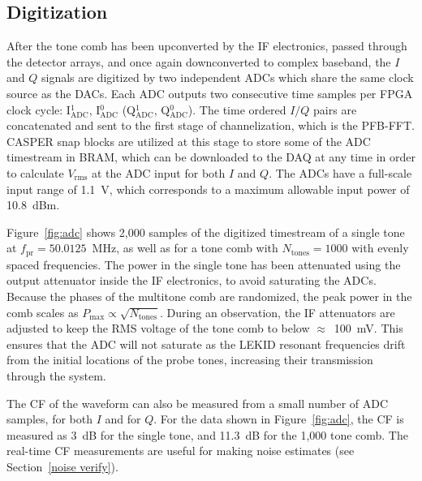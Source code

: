 \subsection{Digitization}\label{digitization}

After the tone comb has been upconverted by the IF electronics, passed through the detector arrays, and once again downconverted to complex baseband, the $I$ and $Q$ signals are digitized by two independent ADCs which share the same clock source as the DACs. Each ADC outputs two consecutive time samples per FPGA clock cycle: I$_{\mathrm{ADC}}^{1}$, I$_{\mathrm{ADC}}^{0}$ (Q$_{\mathrm{ADC}}^{1}$, Q$_{\mathrm{ADC}}^{0}$). The time ordered $I/Q$ pairs are concatenated and sent to the first stage of channelization, which is the PFB-FFT\@. CASPER snap blocks are utilized at this stage to store some of the ADC timestream in BRAM, which can be downloaded to the DAQ at any time in order to calculate $V_{\mathrm{rms}}$ at the ADC input for both $I$ and $Q$. The ADCs have a full-scale input range of 1.1~V, which corresponds to a maximum allowable input power of 10.8~dBm.

Figure~\ref{fig:adc} shows 2,000 samples of the digitized timestream of a single tone at $f_{\mathrm{pr}} = 50.0125$~MHz, as well as for a tone comb with $N_{\mathrm{tones}} = 1000$ with evenly spaced frequencies. The power in the single tone has been attenuated using the output attenuator inside the IF electronics, to avoid saturating the ADCs. Because the phases of the multitone comb are randomized, the peak power in the comb scales as $P_{\mathrm{max}} \propto \sqrt{N_{\mathrm{tones}}}$. During an observation, the IF attenuators are adjusted to keep the RMS voltage of the tone comb to below $\approx$~100~mV. This ensures that the ADC will not saturate as the LEKID resonant frequencies drift from the initial locations of the probe tones, increasing their transmission through the system.

The CF of the waveform can also be measured from a small number of ADC samples, for both $I$ and for $Q$. For the data shown in Figure~\ref{fig:adc}, the CF is measured as 3~dB for the single tone, and 11.3~dB for the 1,000 tone comb. The real-time CF measurements are useful for making noise estimates (see Section~\ref{noise verify}).

